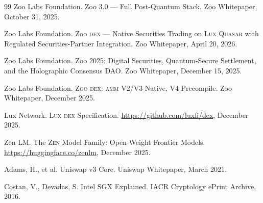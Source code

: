 \documentclass[11pt,letterpaper]{article}
\newcommand{\Zoo}{\textsc{Zoo}}
\newcommand{\Lux}{\textsc{Lux}}
\newcommand{\Zen}{\textsc{Zen}}
\newcommand{\Quasar}{\textsc{Quasar}}
\newcommand{\AMM}{\textsc{amm}}
\newcommand{\DEX}{\textsc{dex}}
\begin{document}
\begin{thebibliography}{99}
Zoo Labs Foundation.
\newblock Zoo 3.0 --- Full Post-Quantum Stack.
\newblock Zoo Whitepaper, October 31, 2025.

Zoo Labs Foundation.
\newblock Zoo \DEX{} --- Native Securities Trading on \Lux{} \Quasar{} with Regulated Securities-Partner Integration.
\newblock Zoo Whitepaper, April 20, 2026.

Zoo Labs Foundation.
\newblock Zoo 2025: Digital Securities, Quantum-Secure Settlement, and the Holographic Consensus DAO.
\newblock Zoo Whitepaper, December 15, 2025.

Zoo Labs Foundation.
\newblock \Zoo{} \DEX{}: \AMM{} V2/V3 Native, V4 Precompile.
\newblock Zoo Whitepaper, December 2025.

Lux Network.
\newblock \Lux{} \DEX{} Specification.
\newblock \url{https://github.com/luxfi/dex}, December 2025.

Zen LM.
\newblock The \Zen{} Model Family: Open-Weight Frontier Models.
\newblock \url{https://huggingface.co/zenlm}, December 2025.

Adams, H., et al.
\newblock Uniswap v3 Core.
\newblock Uniswap Whitepaper, March 2021.

Costan, V., Devadas, S.
\newblock Intel SGX Explained.
\newblock IACR Cryptology ePrint Archive, 2016.

\end{thebibliography}
\end{document}

